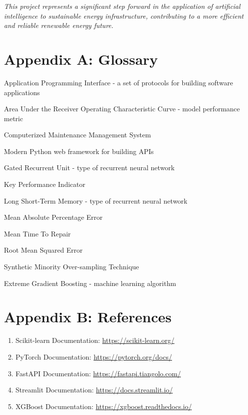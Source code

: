 \documentclass[12pt,a4paper]{article}
\begin{document}
\vspace{1cm}

\begin{center}
\textit{This project represents a significant step forward in the application of artificial intelligence to sustainable energy infrastructure, contributing to a more efficient and reliable renewable energy future.}
\end{center}

\newpage

\appendix

\section{Appendix A: Glossary}

\begin{description}[leftmargin=*]
    \item[API] Application Programming Interface - a set of protocols for building software applications
    \item[AUC-ROC] Area Under the Receiver Operating Characteristic Curve - model performance metric
    \item[CMMS] Computerized Maintenance Management System
    \item[FastAPI] Modern Python web framework for building APIs
    \item[GRU] Gated Recurrent Unit - type of recurrent neural network
    \item[KPI] Key Performance Indicator
    \item[LSTM] Long Short-Term Memory - type of recurrent neural network
    \item[MAPE] Mean Absolute Percentage Error
    \item[MTTR] Mean Time To Repair
    \item[RMSE] Root Mean Squared Error
    \item[SMOTE] Synthetic Minority Over-sampling Technique
    \item[XGBoost] Extreme Gradient Boosting - machine learning algorithm
\end{description}

\section{Appendix B: References}

\begin{enumerate}
    \item Scikit-learn Documentation: \url{https://scikit-learn.org/}
    \item PyTorch Documentation: \url{https://pytorch.org/docs/}
    \item FastAPI Documentation: \url{https://fastapi.tiangolo.com/}
    \item Streamlit Documentation: \url{https://docs.streamlit.io/}
    \item XGBoost Documentation: \url{https://xgboost.readthedocs.io/}
\end{enumerate}
\end{document}
